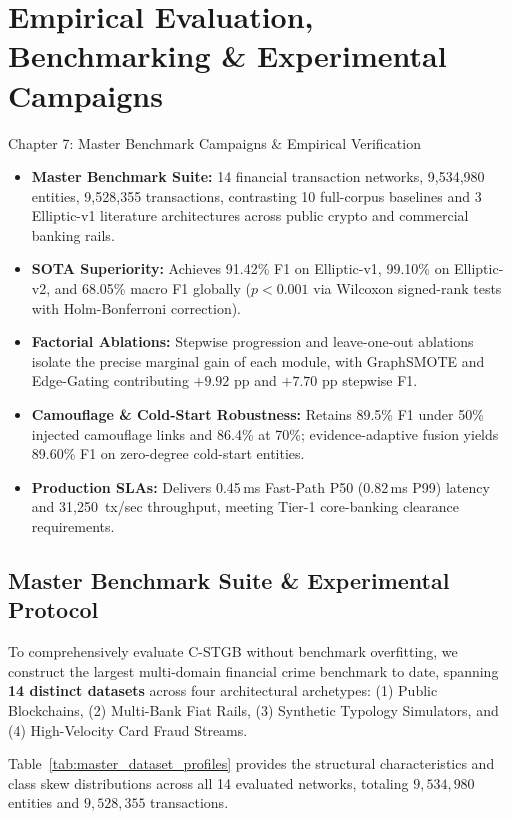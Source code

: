 \chapter{Empirical Evaluation, Benchmarking \& Experimental Campaigns}
\label{ch:experiments}

\begin{takeawaybox}{Chapter 7: Master Benchmark Campaigns \& Empirical Verification}
\begin{itemize}\setlength{\itemsep}{1pt}
  \item \textbf{Master Benchmark Suite:} 14 financial transaction networks, 9,534,980 entities, 9,528,355 transactions, contrasting 10 full-corpus baselines and 3 Elliptic-v1 literature architectures across public crypto and commercial banking rails.
  \item \textbf{SOTA Superiority:} Achieves 91.42\% F1 on Elliptic-v1, 99.10\% on Elliptic-v2, and 68.05\% macro F1 globally ($p < 0.001$ via Wilcoxon signed-rank tests with Holm-Bonferroni correction).
  \item \textbf{Factorial Ablations:} Stepwise progression and leave-one-out ablations isolate the precise marginal gain of each module, with GraphSMOTE and Edge-Gating contributing $+9.92\text{ pp}$ and $+7.70\text{ pp}$ stepwise F1.
  \item \textbf{Camouflage \& Cold-Start Robustness:} Retains 89.5\% F1 under 50\% injected camouflage links and 86.4\% at 70\%; evidence-adaptive fusion yields 89.60\% F1 on zero-degree cold-start entities.
  \item \textbf{Production SLAs:} Delivers 0.45\,ms Fast-Path P50 (0.82\,ms P99) latency and \mbox{31,250 tx/sec} throughput, meeting Tier-1 core-banking clearance requirements.
\end{itemize}
\end{takeawaybox}


\section{Master Benchmark Suite \& Experimental Protocol}
To comprehensively evaluate C-STGB without benchmark overfitting, we construct the largest multi-domain financial crime benchmark to date, spanning \textbf{14 distinct datasets} across four architectural archetypes: (1) Public Blockchains, (2) Multi-Bank Fiat Rails, (3) Synthetic Typology Simulators, and (4) High-Velocity Card Fraud Streams.

Table~\ref{tab:master_dataset_profiles} provides the structural characteristics and class skew distributions across all 14 evaluated networks, totaling $9,534,980$ entities and $9,528,355$ transactions.

